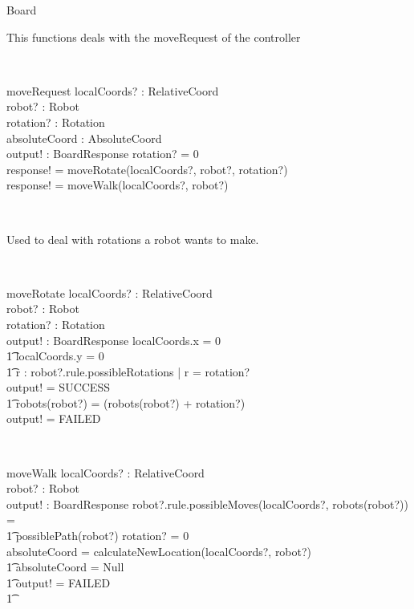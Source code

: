 \documentclass[12pt]{article}
\begin{document}
\begin{class}{Board}
\begin{classcom}
This functions deals with the moveRequest of the controller
\end{classcom} \\
\begin{schema}{moveRequest}
localCoords? : RelativeCoord \\
robot? : Robot \\
rotation? : Rotation \\
absoluteCoord : AbsoluteCoord \\
output! : BoardResponse
\where
\IF rotation? \not = 0 \\
\THEN response! = moveRotate(localCoords?, robot?, rotation?) \\
\ELSE response! = moveWalk(localCoords?, robot?)
\end{schema} \\
\begin{classcom}
Used to deal with rotations a robot wants to make.
\end{classcom} \\
\begin{schema}{moveRotate}
localCoords? : RelativeCoord \\
robot? : Robot \\
rotation? : Rotation \\
output! : BoardResponse
\where
\IF localCoords.x = 0 \\ \t1
localCoords.y = 0 \\ \t1
 \exists r : robot?.rule.possibleRotations | r = rotation?\\
\THEN output! = SUCCESS \\ \t1
robots(robot?) = (robots(robot?) + rotation?)  \\
\ELSE output! = FAILED
\end{schema} \\
\znewpage
\begin{schema}{moveWalk}
localCoords? : RelativeCoord \\
robot? : Robot \\
output! : BoardResponse
\where
\IF robot?.rule.possibleMoves(localCoords?, robots(robot?)) = \\ \t1
possiblePath(robot?) \wedge rotation? = 0 \\
\THEN absoluteCoord = calculateNewLocation(localCoords?, robot?)\\ \t1
\IF absoluteCoord = Null \\ \t1
\THEN output! = FAILED \\ \t1

\end{schema}
\end{class}
\end{document}
